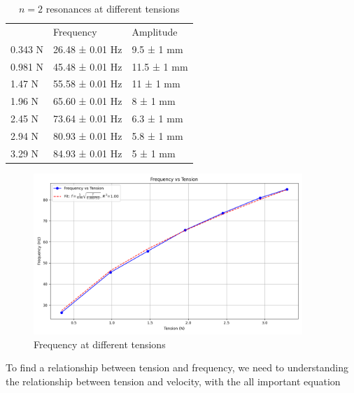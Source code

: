 \documentclass[12pt,letterpaper]{article}
\begin{document}
\begin{table}[ht]
\centering
\begin{tabular}{lll}
                             & Frequency                            & Amplitude                        \\ \cline{2-3} 
\multicolumn{1}{l|}{0.343 N} & \multicolumn{1}{l|}{26.48 ± 0.01 Hz} & \multicolumn{1}{l|}{9.5 ± 1 mm}  \\ \cline{2-3} 
\multicolumn{1}{l|}{0.981 N} & \multicolumn{1}{l|}{45.48 ± 0.01 Hz} & \multicolumn{1}{l|}{11.5 ± 1 mm} \\ \cline{2-3} 
\multicolumn{1}{l|}{1.47 N}  & \multicolumn{1}{l|}{55.58 ± 0.01 Hz} & \multicolumn{1}{l|}{11 ± 1 mm}   \\ \cline{2-3} 
\multicolumn{1}{l|}{1.96 N}  & \multicolumn{1}{l|}{65.60 ± 0.01 Hz} & \multicolumn{1}{l|}{8 ± 1 mm}    \\ \cline{2-3} 
\multicolumn{1}{l|}{2.45 N}  & \multicolumn{1}{l|}{73.64 ± 0.01 Hz} & \multicolumn{1}{l|}{6.3 ± 1 mm}  \\ \cline{2-3} 
\multicolumn{1}{l|}{2.94 N}  & \multicolumn{1}{l|}{80.93 ± 0.01 Hz} & \multicolumn{1}{l|}{5.8 ± 1 mm}  \\ \cline{2-3} 
\multicolumn{1}{l|}{3.29 N}  & \multicolumn{1}{l|}{84.93 ± 0.01 Hz} & \multicolumn{1}{l|}{5 ± 1 mm}    \\ \cline{2-3} 
\end{tabular}
\label{tab:2n}
\caption{$n=2$ resonances at different tensions}
\end{table}

\begin{figure}[h]
    \centering
    \includegraphics[width=4in]{images/tension_vs_frequency.png}
    \caption{Frequency at different tensions}
    \label{fig:tension}
\end{figure}

To find a relationship between tension and frequency, we need to understanding the relationship between tension and velocity, with the all important equation
\end{document}
